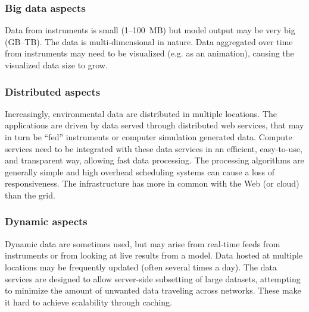 \subsubsection*{Big data aspects}



Data from instruments is small (1--100~MB) but model output may be very big (GB--TB). The data is
multi-dimensional in nature. Data aggregated over time from instruments may need to be visualized
(e.g. as an animation), causing the visualized data size to grow.

 \subsubsection*{Distributed aspects}



 Increasingly, environmental data are distributed in multiple
 locations.  The applications are driven by data served through
 distributed web services, that may in turn be ``fed'' instruments or
 computer simulation generated data. Compute services need to be
 integrated with these data services in an efficient, easy-to-use, and
 transparent way, allowing fast data processing.  The processing
 algorithms are generally simple and high overhead scheduling systems
 can cause a loss of responsiveness.  The infrastructure has more in
 common with the Web (or cloud) than the grid.


 \subsubsection*{Dynamic aspects}



Dynamic data are sometimes used, but may arise from real-time feeds from
instruments or from looking at live results from a model. Data hosted at
multiple locations may be frequently updated (often several times a day).
The data services are designed to allow server-side subsetting of large
datasets, attempting to minimize the amount of unwanted data traveling
across networks.  These make it hard to achieve scalability through caching.

